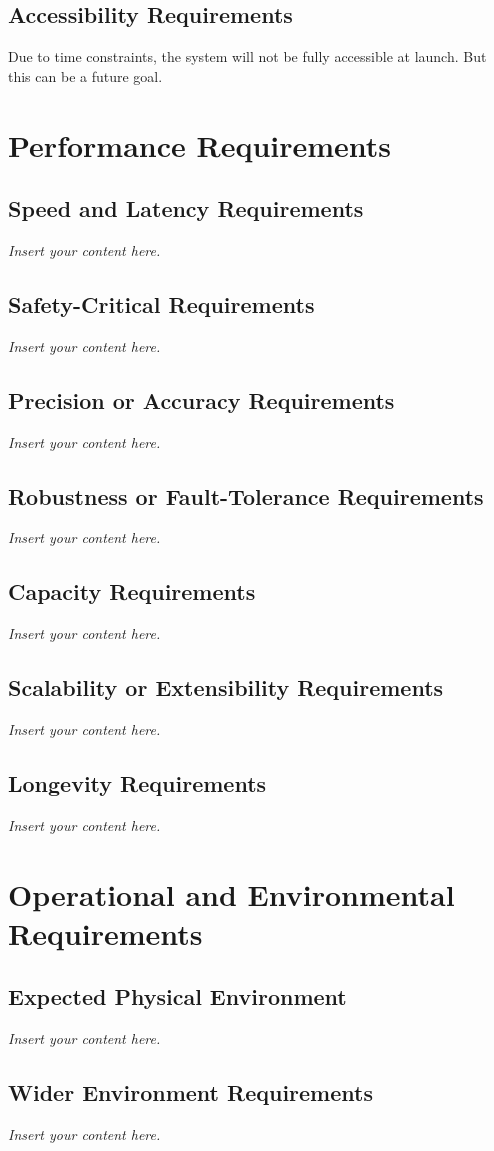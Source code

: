 \documentclass[12pt]{article}
\newcommand{\lips}{\textit{Insert your content here.}}
\begin{document}
\subsection{Accessibility Requirements}
Due to time constraints, the system will not be fully accessible at launch. But this can be a future goal.

\section{Performance Requirements}
\subsection{Speed and Latency Requirements}
\lips
\subsection{Safety-Critical Requirements}
\lips
\subsection{Precision or Accuracy Requirements}
\lips
\subsection{Robustness or Fault-Tolerance Requirements}
\lips
\subsection{Capacity Requirements}
\lips
\subsection{Scalability or Extensibility Requirements}
\lips
\subsection{Longevity Requirements}
\lips

\section{Operational and Environmental Requirements}
\subsection{Expected Physical Environment}
\lips
\subsection{Wider Environment Requirements}
\lips
\end{document}
